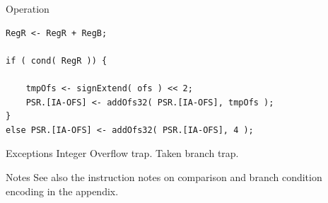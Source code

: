 \begin{iPageDescOpEntry}{Operation}
\begin{lstlisting}[style=iPageOpStyle]
RegR <- RegR + RegB;

if ( cond( RegR )) {

    tmpOfs <- signExtend( ofs ) << 2;
    PSR.[IA-OFS] <- addOfs32( PSR.[IA-OFS], tmpOfs );
}
else PSR.[IA-OFS] <- addOfs32( PSR.[IA-OFS], 4 );
\end{lstlisting}
\end{iPageDescOpEntry}

\begin{iPageDescEntry}{Exceptions}
	Integer Overflow trap.
	Taken branch trap.
\end{iPageDescEntry}

\begin{iPageDescEntry}{Notes}
See also the instruction notes on comparison and branch condition encoding in the appendix.
\end{iPageDescEntry}
